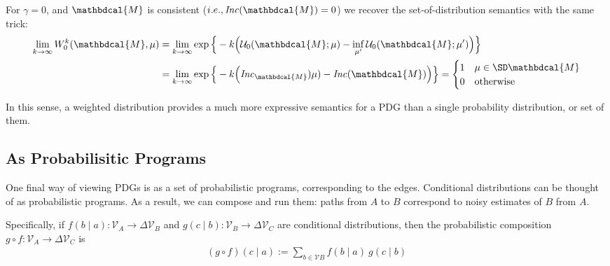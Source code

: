 \documentclass{article}
\theoremstyle{plain}
\theoremstyle{definition}
\theoremstyle{remark}
\newcommand{\note}[1]{{\color{blue}\ \!\Large\smash{\textbf{[}}{\normalsize\textsc{note:} #1}\ \!\smash{\textbf{]}}}}
\newcommand{\dg}[1]{\mathbdcal{#1}}
\newcommand\Inc{\mathit{Inc}}
\numberwithin{equation}{section}
\begin{document}
{For $\gamma = 0$, and $\dg M$ is consistent
($i.e., \Inc(\dg   M) = 0$)
 we recover the set-of-distribution semantics with
          the same trick: 
	\begin{align*}
		 \lim_{k \to \infty} W_0^k(\dg M, \mu)
		&= \lim_{k \to \infty} \exp\Big\{-k \Big(\mathcal U_0(\dg M;\mu) - \inf_{\mu'} \mathcal U_0(\dg M; \mu')\Big) \Big\} \\
		&= \lim_{k \to \infty} \exp\Big\{-k \Big(\Inc_{\dg
                 M})\mu) - \Inc(\dg M)\Big) \Big\}  
		= \begin{cases}
			1 & \mu \in \SD\dg M \\
			0 & \text{otherwise}
		\end{cases} 
	\end{align*}

	In this sense, a weighted distribution provides a much more expressive semantics for a PDG than a single probability distribution, or set of them.

	\begin{vleftovers}
	\subsection{As Probabilisitic Programs}\label{sec:prog-semantics}
	
	One final way of viewing PDGs is as a set of probabilistic programs, corresponding to the edges. 
	Conditional distributions can be thought of as probabilistic programs. As a result, we can compose and run them: paths from $A$ to $B$ correspond to noisy estimates of $B$ from $A$.
	
	Specifically, if $f(b \mid a) : \mathcal V_A \to \Delta \mathcal V_B$ and $g(c \mid b) : \mathcal V_B \to \Delta \mathcal V_C$ are conditional distributions, then the probabilistic composition $g\circ f : \mathcal V_A \to \Delta\mathcal V_C$ is
	\begin{align*}
		(g\circ  f) (c \mid a) :=  \sum_{b \in \mathcal V B}\!\! f (b \mid a)\ g(c \mid b)
	\end{align*}
	

\end{vleftovers}}
\end{document}
